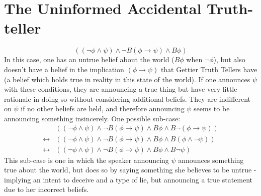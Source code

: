 \documentclass[12pt, titlepage, twoside, a4paper]{report}
\begin{document}
\section{The Uninformed Accidental Truth-teller}
$$((\neg \phi \wedge \psi) \wedge \neg B(\phi \to \psi) \wedge B \phi)$$
In this case, one has an untrue belief about the world ($B\phi$ when $\neg \phi$), but also doesn't have a belief in the implication $(\phi \to \psi)$ that Gettier Truth Tellers have (a belief which holds true in reality in this state of the world). If one announces $\psi$ with these conditions, they are announcing a true thing but have very little rationale in doing so without considering additional beliefs. They are indifferent on $\psi$ if no other beliefs are held, and therefore announcing $\psi$ seems to be announcing something insincerely. One possible sub-case:
\begin{align*}
&((\neg \phi \wedge \psi) \wedge \neg B(\phi \to \psi) \wedge B \phi \wedge B \neg (\phi \to \psi ))\\
\leftrightarrow &((\neg \phi \wedge \psi) \wedge \neg B(\phi \to \psi) \wedge B \phi \wedge B (\phi \wedge \neg \psi ))\\
\leftrightarrow &((\neg \phi \wedge \psi) \wedge \neg B(\phi \to \psi) \wedge B \phi \wedge B \neg \psi)
\end{align*}
This sub-case is one in which the speaker announcing $\psi$ announces something true about the world, but does so by saying something she believes to be untrue - implying an intent to deceive and a type of lie, but announcing a true statement due to her incorrect beliefs. 
\newpage
\end{document}
